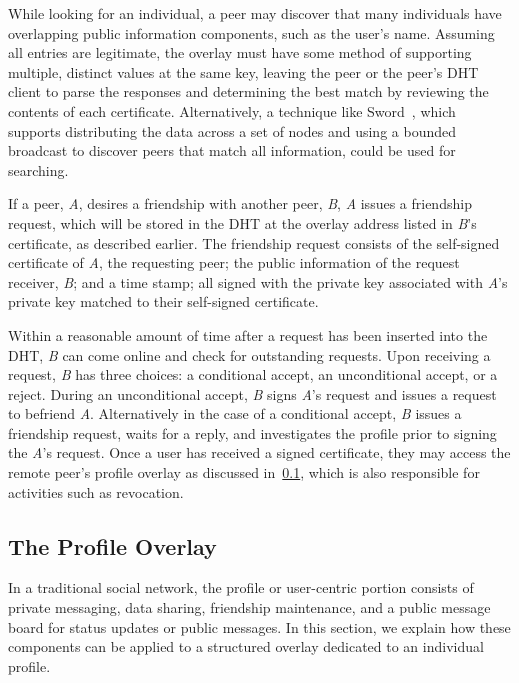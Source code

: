 \documentclass[conference]{IEEEtran}
\begin{document}
While looking for an individual, a peer may discover that many individuals have
overlapping public information components, such as the user's name.  Assuming
all entries are legitimate, the overlay must have some method of supporting
multiple, distinct values at the same key, leaving the peer or the peer's DHT
client to parse the responses and determining the best match by reviewing the
contents of each certificate.  Alternatively, a technique like
Sword~\cite{sword}, which supports distributing the data across a set of nodes
and using a bounded broadcast to discover peers that match all information,
could be used for searching.

If a peer, \textit{A}, desires a friendship with another peer, \textit{B},
\textit{A} issues a friendship request, which will be stored in the DHT
at the overlay address listed in \textit{B}'s certificate, as described earlier.
The friendship request consists of the self-signed certificate of
\textit{A}, the requesting peer; the public information of the request receiver,
\textit{B}; and a time stamp; all signed with the private key associated with 
\textit{A}'s private key matched to their self-signed certificate.

Within a reasonable amount of time after a request has been inserted into the
DHT, \textit{B} can come online and check for outstanding requests.  Upon
receiving a request, \textit{B} has three choices: a conditional accept, an
unconditional accept, or a reject.  During an unconditional accept, \textit{B}
signs \textit{A}'s request and issues a request to befriend \textit{A}.
Alternatively in the case of a conditional accept, \textit{B} issues a friendship
request, waits for a reply, and investigates the profile prior to signing the
\textit{A}'s request.  Once a user has received a signed certificate,
they may access the remote peer's profile overlay as discussed
in~\ref{profile_overlay}, which is also responsible for activities such as
revocation.


\subsection{The Profile Overlay}
\label{profile_overlay}
In a traditional social network, the profile or user-centric portion consists
of private messaging, data sharing, friendship maintenance, and a
public message board for status updates or public messages.  In this
section, we explain how these components can be applied to a structured overlay
dedicated to an individual profile.
\end{document}
